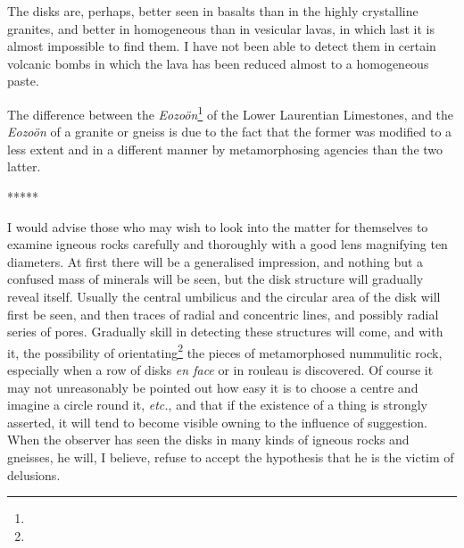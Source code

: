 \documentclass[a4paper, 12pt, oneside]{article}
\begin{document}
The disks are, perhaps, better seen in basalts than in the highly crystalline granites, and better in homogeneous than in vesicular lavas, in which last it is almost impossible to find them. I have not been able to detect them in certain volcanic bombs in which the lava has been reduced almost to a homogeneous paste.

The difference between the \emph{Eozoön}\footnote{} of the Lower Laurentian Limestones, and the \emph{Eozoön} of a granite or gneiss is due to the fact that the former was modified to a less extent and in a different manner by metamorphosing agencies than the two latter.

\centerline{*\hspace{15mm}*\hspace{15mm}*\hspace{15mm}*\hspace{15mm}*}
\bigskip

I would advise those who may wish to look into the matter for themselves to examine igneous rocks carefully and thoroughly with a good lens magnifying ten diameters. At first there will be a generalised impression, and nothing but a confused mass of minerals will be seen, but the disk structure will gradually reveal itself. Usually the central umbilicus and the circular area of the disk will first be seen, and then traces of radial and concentric lines, and possibly radial series of pores. Gradually skill in detecting these structures will come, and with it, the possibility of orientating\footnote{} the pieces of metamorphosed nummulitic rock, especially when a row of disks \emph{en face} or in rouleau is discovered. Of course it may not unreasonably be pointed out how easy it is to choose a centre and imagine a circle round it, \emph{etc.}, and that if the existence of a thing is strongly asserted, it will tend to become visible owning to the influence of suggestion. When the observer has seen the disks in many kinds of igneous rocks and gneisses, he will, I believe, refuse to accept the hypothesis that he is the victim of delusions.
\end{document}
